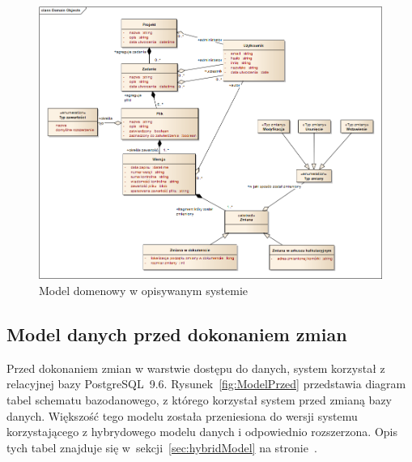 \begin{figure}[!ht]
\centering
\includegraphics[width=\textwidth]{figures/domain_objects.png}
\caption{Model domenowy w opisywanym systemie}
\label{fig:domainObjects}
\end{figure}

\subsection*{Model danych przed dokonaniem zmian}

Przed dokonaniem zmian w warstwie dostępu do danych, system korzystał z relacyjnej bazy PostgreSQL~9.6.
Rysunek~\ref{fig:ModelPrzed} przedstawia diagram tabel schematu bazodanowego, z którego korzystał system przed zmianą bazy danych.
Większość tego modelu została przeniesiona do wersji systemu korzystającego z hybrydowego modelu danych i odpowiednio rozszerzona.
Opis tych tabel znajduje się w~sekcji~\ref{sec:hybridModel} na stronie~\pageref{sec:hybridModel}.

